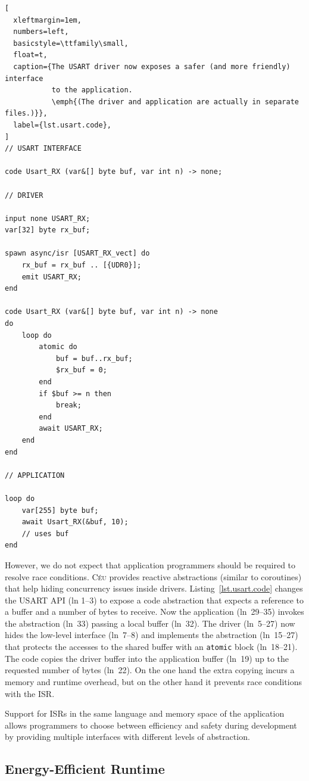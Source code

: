 \documentclass[sigplan,10pt,review,anonymous]{acmart}\settopmatter{printfolios=true,printccs=false,printacmref=false}
\newcommand{\CEU}{\textsc{C\'{e}u}\xspace}
\newcommand{\code}[1] {{\small{\texttt{#1}}}}
\begin{document}
\begin{lstlisting}[
  xleftmargin=1em,
  numbers=left,
  basicstyle=\ttfamily\small,
  float=t,
  caption={The USART driver now exposes a safer (and more friendly) interface
           to the application.
           \emph{(The driver and application are actually in separate files.)}},
  label={lst.usart.code},
]
// USART INTERFACE

code Usart_RX (var&[] byte buf, var int n) -> none;

// DRIVER

input none USART_RX;
var[32] byte rx_buf;

spawn async/isr [USART_RX_vect] do
    rx_buf = rx_buf .. [{UDR0}];
    emit USART_RX;
end

code Usart_RX (var&[] byte buf, var int n) -> none
do
    loop do
        atomic do
            buf = buf..rx_buf;
            $rx_buf = 0;
        end
        if $buf >= n then
            break;
        end
        await USART_RX;
    end
end

// APPLICATION

loop do
    var[255] byte buf;
    await Usart_RX(&buf, 10);
    // uses buf
end
\end{lstlisting}

However, we do not expect that application programmers should be required to
resolve race conditions.
\CEU provides reactive abstractions (similar to coroutines) that help hiding
concurrency issues inside drivers.
%
Listing~\ref{lst.usart.code} changes the USART API (ln 1--3) to expose a code
abstraction that expects a reference to a buffer and a number of bytes to
receive.
Now the application (ln~29--35) invokes the abstraction (ln~33) passing a local
buffer (ln~32).
%
The driver (ln~5--27) now hides the low-level interface (ln~7--8) and
implements the abstraction (ln~15--27) that protects the accesses to the shared
buffer with an \code{atomic} block (ln~18--21).
%
The code copies the driver buffer into the application buffer (ln~19) up to the
requested number of bytes (ln~22).
%
On the one hand the extra copying incurs a memory and runtime overhead, but on
the other hand it prevents race conditions with the ISR.

Support for ISRs in the same language and memory space of the application
allows programmers to choose between efficiency and safety during development
by providing multiple interfaces with different levels of abstraction.

\subsection{Energy-Efficient Runtime}
\label{sec.energy}
\end{document}
